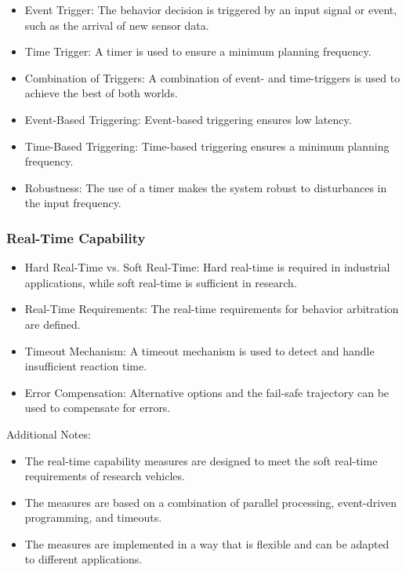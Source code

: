 \begin{itemize}
    \item Event Trigger: The behavior decision is triggered by an input signal or event, such as the arrival of new sensor data.
    \item Time Trigger: A timer is used to ensure a minimum planning frequency.
    \item Combination of Triggers: A combination of event- and time-triggers is used to achieve the best of both worlds.
    \item Event-Based Triggering: Event-based triggering ensures low latency.
    \item Time-Based Triggering: Time-based triggering ensures a minimum planning frequency.
    \item Robustness: The use of a timer makes the system robust to disturbances in the input frequency.
\end{itemize}

\subsubsection*{Real-Time Capability}


\begin{itemize}
\item Hard Real-Time vs. Soft Real-Time: Hard real-time is required in industrial applications, while soft real-time is sufficient in research.
\item Real-Time Requirements: The real-time requirements for behavior arbitration are defined.
\item Timeout Mechanism: A timeout mechanism is used to detect and handle insufficient reaction time.
\item Error Compensation: Alternative options and the fail-safe trajectory can be used to compensate for errors.
\end{itemize}

Additional Notes:

\begin{itemize}
    \item The real-time capability measures are designed to meet the soft real-time requirements of research vehicles.
    \item The measures are based on a combination of parallel processing, event-driven programming, and timeouts.
    \item The measures are implemented in a way that is flexible and can be adapted to different applications.
\end{itemize}

